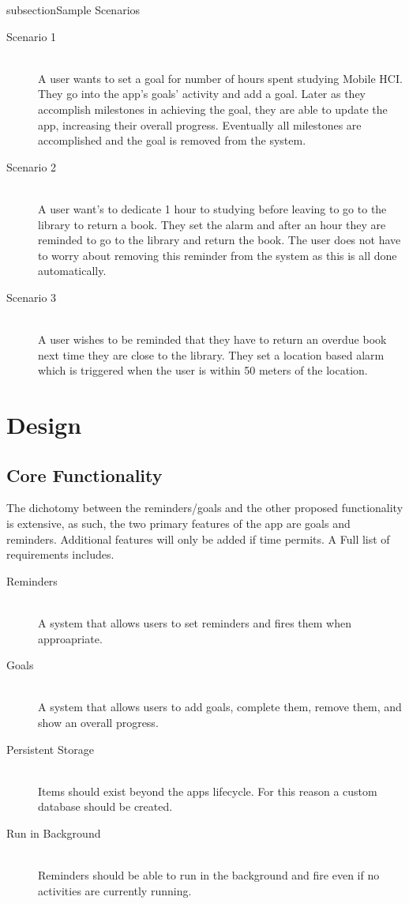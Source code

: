 \documentclass[12pt]{article} %
\begin{document}
subsection{Sample Scenarios}
\begin{description}
\item[Scenario 1] \hfil\\
A user wants to set a goal for number of hours spent studying Mobile HCI. They go into the app's goals' activity and add a goal. Later as they accomplish milestones in achieving the goal, they are able to update the app, increasing their overall progress. Eventually all milestones are accomplished and the goal is removed from the system.
\item[Scenario 2] \hfil\\
A user want's to dedicate 1 hour to studying before leaving to go to the library to return a book. They set the alarm and after an hour they are reminded to go to the library and return the book. The user does not have to worry about removing this reminder from the system as this is all done automatically.
\item[Scenario 3] \hfil\\
A user wishes to be reminded that they have to return an overdue book next time they are close to the library. They set a location based alarm which is triggered when the user is within 50 meters of the location.
\end{description}

\section{Design}
\subsection{Core Functionality}
The dichotomy between the reminders/goals and the other proposed functionality is extensive, as such, the two primary features of the app are goals and reminders. Additional features will only be added if time permits. A Full list of requirements includes.

\begin{description}
\item[Reminders] \hfil\\
A system that allows users to set reminders and fires them when approapriate.
\item[Goals] \hfil\\
A system that allows users to add goals, complete them, remove them, and show an overall progress.
\item[Persistent Storage] \hfil\\
Items should exist beyond the apps lifecycle. For this reason a custom database should be created.
\item[Run in Background] \hfil\\
Reminders should be able to run in the background and fire even if no activities are currently running.
\end{description}
\end{document}
